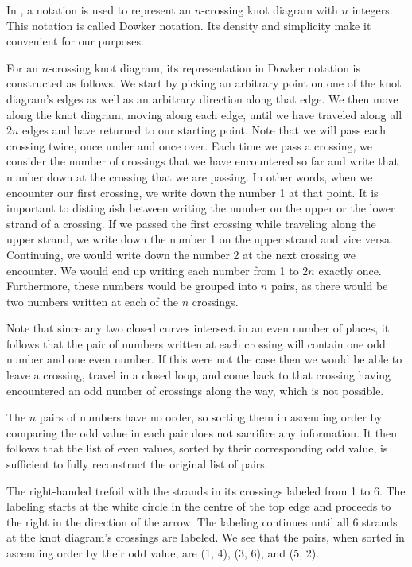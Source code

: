 \begin{paper}
In \cite{htw}, a notation is used to represent an $n$-crossing knot diagram with
$n$ integers.
This notation is called Dowker notation.
Its density and simplicity make it convenient for our purposes.

For an $n$-crossing knot diagram, its representation in Dowker notation is
constructed as follows.
We start by picking an arbitrary point on one of the knot diagram's edges as
well as an arbitrary direction along that edge.
We then move along the knot diagram, moving along each edge, until we have
traveled along all $2n$ edges and have returned to our starting point.
Note that we will pass each crossing twice, once under and once over.
Each time we pass a crossing, we consider the number of crossings that we
have encountered so far and write that number down at the crossing that we are
passing.
In other words, when we encounter our first crossing, we write down the number 1
at that point.
It is important to distinguish between writing the number on the upper or the
lower strand of a crossing.
If we passed the first crossing while traveling along the upper strand, we write
down the number 1 on the upper strand and vice versa.
Continuing, we would write down the number 2 at the next crossing we encounter.
We would end up writing each number from 1 to $2n$ exactly once.
Furthermore, these numbers would be grouped into $n$ pairs, as there would be
two numbers written at each of the $n$ crossings.

Note that since any two closed curves intersect in an even number of places, it
follows that the pair of numbers written at each crossing will contain one odd
number and one even number.
If this were not the case then we would be able to leave a crossing, travel in a
closed loop, and come back to that crossing having encountered an odd number of
crossings along the way, which is not possible.

The $n$ pairs of numbers have no order, so sorting them in ascending order by
comparing the odd value in each pair does not sacrifice any information.
It then follows that the list of even values, sorted by their corresponding odd
value, is sufficient to fully reconstruct the original list of pairs.\\

{\begin{center}\end{center}}
{The right-handed trefoil with the strands in its crossings labeled from 1 to 6.
The labeling starts at the white circle in the centre of the top edge and
proceeds to the right in the direction of the arrow.
The labeling continues until all 6 strands at the knot diagram's crossings are
labeled.
We see that the pairs, when sorted in ascending order by their odd value, are
(1, 4), (3, 6), and (5, 2).}


\end{paper}
